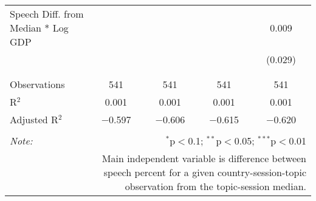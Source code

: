 \begin{table}[!htbp]
\begin{tabular}{@{\extracolsep{5pt}}lcccc}
 Speech Diff. from Median * Log GDP &  &  &  & 0.009 \\ 
  &  &  &  & (0.029) \\ 
  & & & & \\ 
\hline \\[-1.8ex] 
Observations & 541 & 541 & 541 & 541 \\ 
R$^{2}$ & 0.001 & 0.001 & 0.001 & 0.001 \\ 
Adjusted R$^{2}$ & $-$0.597 & $-$0.606 & $-$0.615 & $-$0.620 \\ 
\hline 
\hline \\[-1.8ex] 
\textit{Note:}  & \multicolumn{4}{r}{$^{*}$p$<$0.1; $^{**}$p$<$0.05; $^{***}$p$<$0.01} \\ 
 & \multicolumn{4}{r}{Main independent variable is difference between speech percent for a given country-session-topic observation from the topic-session median.} \\ 
\end{tabular} 
\end{table} 
